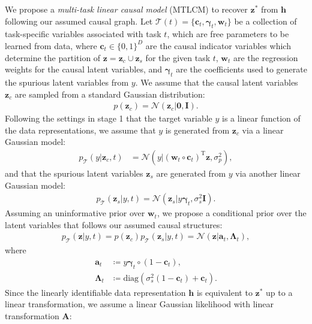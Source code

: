 \documentclass[nohyperref]{article}
\theoremstyle{plain}
\theoremstyle{definition}
\theoremstyle{remark}
\begin{document}
We propose a \textit{multi-task linear causal model} (MTLCM) to recover $\mathbf{z}^*$ from $\mathbf{h}$ following our assumed causal graph. Let $\mathcal{T}(t)=\{\mathbf{c}_t,\boldsymbol{\gamma}_t,\mathbf{w}_t\}$ be a collection of task-specific variables associated with task $t$, which are free parameters to be learned from data, where $\mathbf{c}_t\in\{0,1\}^D$ are the causal indicator variables which determine the partition of $\mathbf{z}=\mathbf{z}_c\cup\mathbf{z}_s$ for the given task $t$, $\mathbf{w}_t$ are the regression weights for the causal latent variables, and $\boldsymbol{\gamma}_t$ are the coefficients used to generate the spurious latent variables from $y$. We assume that the causal latent variables $\mathbf{z}_c$ are sampled from a standard Gaussian distribution:
\begin{align}
    p(\mathbf{z}_c)=\mathcal{N}(\mathbf{z}_c|\mathbf{0},\mathbf{I}).
\end{align}
Following the settings in stage 1 that the target variable $y$ is a linear function of the data representations, we assume that $y$ is generated from $\mathbf{z}_c$ via a linear Gaussian model:
\begin{align}
    p_{\mathcal{T}}(y|\mathbf{z}_c,t) & =\mathcal{N}(y|(\mathbf{w}_t\circ\mathbf{c}_t)^{\text{T}}\mathbf{z},\sigma_{p}^{2}),
\end{align}
and that the spurious latent variables $\mathbf{z}_s$ are generated from $y$ via another linear Gaussian model:
\begin{align}
    p_{\mathcal{T}}(\mathbf{z}_s|y,t)=\mathcal{N}(\mathbf{z}_s|y\boldsymbol{\gamma}_t,\sigma_s^2\mathbf{I}).
\end{align}
Assuming an uninformative prior over $\mathbf{w}_t$, we propose a conditional prior over the latent variables that follows our assumed causal structures:
\begin{align}\label{eq:lin-causal-prior}
        p_{\mathcal{T}}(\mathbf{z}|y,t)
        =p(\mathbf{z}_c)p_{\mathcal{T}}(\mathbf{z}_s|y,t)
        =\mathcal{N}(\mathbf{z}|\mathbf{a}_t,\boldsymbol{\Lambda}_t),
\end{align}
where
\begin{align}
    \mathbf{a}_t&\coloneqq y\boldsymbol{\gamma}_t\circ(1-\mathbf{c}_t),\\
    \boldsymbol{\Lambda}_t&\coloneqq \text{diag}(\sigma_{s}^{2}(1-\mathbf{c}_t)+\mathbf{c}_t).
\end{align}
Since the linearly identifiable data representation $\mathbf{h}$ is equivalent to $\mathbf{z}^*$ up to a linear transformation, we assume a linear Gaussian likelihood with linear transformation $\mathbf{A}$:
\end{document}
